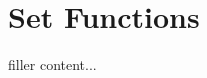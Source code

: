 \documentclass[../../templates/section]{subfiles}
\begin{document}
\section{Set Functions}\label{sec:set-functions}

filler content...
\end{document}
